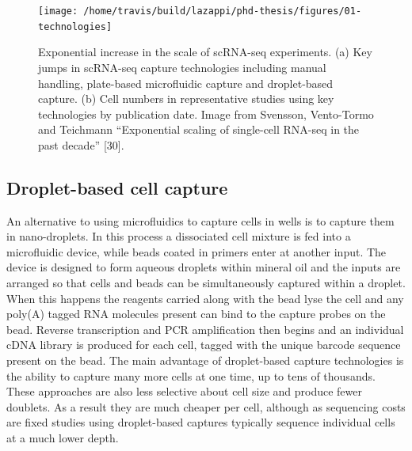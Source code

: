 \documentclass[11pt,a4paper,titlepage,twoside,openright]{style/unimelbthesis}
\theoremstyle{definition}
\theoremstyle{definition}
\theoremstyle{definition}
\theoremstyle{remark}
\begin{document}
\begin{mainmatter}
\begin{figure}

{\centering \texttt{[image: /home/travis/build/lazappi/phd-thesis/figures/01-technologies]} 

}

\caption[Exponential increase in the scale of scRNA-seq experiments.]{Exponential increase in the scale of scRNA-seq experiments. (a) Key jumps in scRNA-seq capture technologies including manual handling, plate-based microfluidic capture and droplet-based capture. (b) Cell numbers in representative studies using key technologies by publication date. Image from Svensson, Vento-Tormo and Teichmann \enquote{Exponential scaling of single-cell RNA-seq in the past decade} {[}30{]}.}\label{fig:technologies}
\end{figure}





\hypertarget{droplet-based-cell-capture}{%
\subsection{Droplet-based cell capture}\label{droplet-based-cell-capture}}

An alternative to using microfluidics to capture cells in wells is to capture them in nano-droplets. In this process a dissociated cell mixture is fed into a microfluidic device, while beads coated in primers enter at another input. The device is designed to form aqueous droplets within mineral oil and the inputs are arranged so that cells and beads can be simultaneously captured within a droplet. When this happens the reagents carried along with the bead lyse the cell and any poly(A) tagged RNA molecules present can bind to the capture probes on the bead. Reverse transcription and PCR amplification then begins and an individual cDNA library is produced for each cell, tagged with the unique barcode sequence present on the bead. The main advantage of droplet-based capture technologies is the ability to capture many more cells at one time, up to tens of thousands. These approaches are also less selective about cell size and produce fewer doublets. As a result they are much cheaper per cell, although as sequencing costs are fixed studies using droplet-based captures typically sequence individual cells at a much lower depth.


\end{mainmatter}
\end{document}
